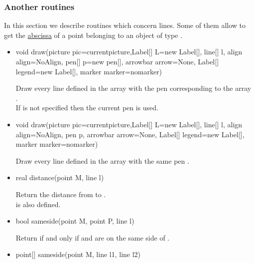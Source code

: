 \documentclass[pdftex]{article}
\begin{document}
\subsubsection{Another routines}
In this section we describe routines which concern lines. Some of them
allow to get the \href{#section.abscissa}{abscissa} of a point
belonging to an object of type .
\begin{itemize}
\item {}%
  \begin{Vcolor}
    void draw(picture pic=currentpicture,Label[] L=new Label[], line[] l,
    align align=NoAlign, pen[] p=new pen[],
    arrowbar arrow=None,
    Label[] legend=new Label[], marker marker=nomarker)
  \end{Vcolor}
  Draw every line defined in the array  with the
  pen corresponding to the array .\\
  If  is not specified then the current pen is used.
\item {}%
  \begin{Vcolor}
    void draw(picture pic=currentpicture,Label[] L=new Label[], line[] l,
    align align=NoAlign, pen p,
    arrowbar arrow=None,
    Label[] legend=new Label[], marker marker=nomarker)
  \end{Vcolor}
  Draw every line defined in the array  with the same
  pen .\\
\item {}%
  \begin{Vcolor}
    real distance(point M, line l)
  \end{Vcolor}
  Return the distance from  to .\\
   is also defined.
\item {}%
  \begin{Vcolor}
    bool sameside(point M, point P, line l)
  \end{Vcolor}
  Return  if and only if  and  are on the
  same side of .
\item {}%
  \begin{Vcolor}
    point[] sameside(point M, line l1, line l2)

\end{Vcolor}
\end{itemize}
\end{document}
